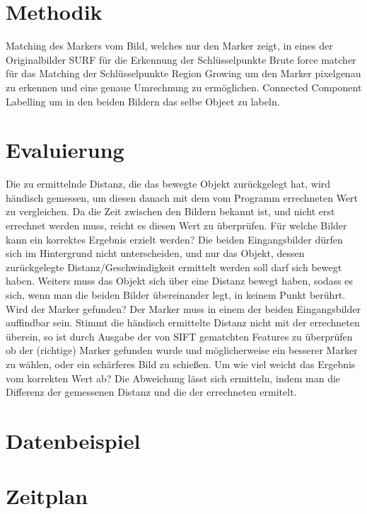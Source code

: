 \documentclass[deutsch]{scrartcl}
\begin{document}
\section{Methodik}
Matching des Markers vom Bild, welches nur den Marker zeigt, in eines der Originalbilder 
SURF für die Erkennung der Schlüsselpunkte
Brute force matcher für das Matching der Schlüsselpunkte
Region Growing um den Marker pixelgenau zu erkennen und eine genaue Umrechnung zu ermöglichen.
Connected Component Labelling um in den beiden Bildern das selbe Object zu labeln.

\section{Evaluierung}
Die zu ermittelnde Distanz, die das bewegte Objekt zurückgelegt hat, wird händisch gemessen, um diesen danach mit dem vom Programm errechneten Wert zu vergleichen. Da die Zeit zwischen den Bildern bekannt ist, und nicht erst errechnet werden muss, reicht es diesen Wert zu überprüfen.
Für welche Bilder kann ein korrektes Ergebnis erzielt werden? Die beiden Eingangsbilder dürfen sich im Hintergrund nicht unterscheiden, und nur das Objekt, dessen zurückgelegte Distanz/Geschwindigkeit ermittelt werden soll darf sich bewegt haben. Weiters muss das Objekt sich über eine Distanz bewegt haben, sodass es sich, wenn man die beiden Bilder übereinander legt, in keinem Punkt berührt.
Wird der Marker gefunden? Der Marker muss in einem der beiden Eingangsbilder auffindbar sein. Stimmt die händisch ermittelte Distanz nicht mit der errechneten überein, so ist durch Ausgabe der von SIFT gematchten Features zu überprüfen ob der (richtige) Marker gefunden wurde und möglicherweise ein besserer Marker zu wählen, oder ein schärferes Bild zu schießen.
Um wie viel weicht das Ergebnis vom korrekten Wert ab? Die Abweichung lässt sich ermitteln, indem man die Differenz der gemessenen Distanz und die der errechneten ermitelt.

\section{Datenbeispiel}


\section{Zeitplan}
\end{document}

